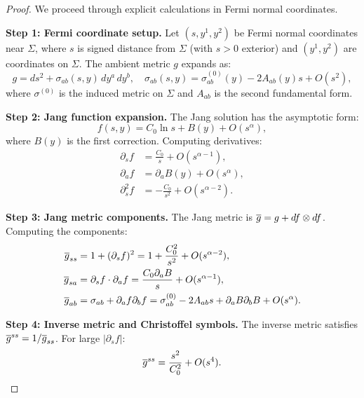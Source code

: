 \begin{proof}
We proceed through explicit calculations in Fermi normal coordinates.

\textbf{Step 1: Fermi coordinate setup.}
Let $(s, y^1, y^2)$ be Fermi normal coordinates near $\Sigma$, where $s$ is signed distance from $\Sigma$ (with $s > 0$ exterior) and $(y^1, y^2)$ are coordinates on $\Sigma$. The ambient metric $g$ expands as:
\begin{equation}\label{eq:FermiExpansion}
    g = ds^2 + \sigma_{ab}(s,y) \, dy^a \, dy^b, \quad \sigma_{ab}(s,y) = \sigma_{ab}^{(0)}(y) - 2 A_{ab}(y) s + O(s^2),
\end{equation}
where $\sigma^{(0)}$ is the induced metric on $\Sigma$ and $A_{ab}$ is the second fundamental form.

\textbf{Step 2: Jang function expansion.}
The Jang solution has the asymptotic form:
\begin{equation}\label{eq:JangExpansion}
    f(s, y) = C_0 \ln s + B(y) + O(s^{\alpha}),
\end{equation}
where $B(y)$ is the first correction. Computing derivatives:
\begin{align}
    \partial_s f &= \frac{C_0}{s} + O(s^{\alpha - 1}), \label{eq:dsf}\\
    \partial_a f &= \partial_a B(y) + O(s^{\alpha}), \label{eq:daf}\\
    \partial_s^2 f &= -\frac{C_0}{s^2} + O(s^{\alpha-2}). \label{eq:dssf}
\end{align}

\textbf{Step 3: Jang metric components.}
The Jang metric is $\overline{g} = g + df \otimes df$. Computing the components:
\begin{align}
    \overline{g}_{ss} &= 1 + (\partial_s f)^2 = 1 + \frac{C_0^2}{s^2} + O(s^{\alpha - 2}), \label{eq:bgss}\\
    \overline{g}_{sa} &= \partial_s f \cdot \partial_a f = \frac{C_0 \partial_a B}{s} + O(s^{\alpha - 1}), \label{eq:bgsa}\\
    \overline{g}_{ab} &= \sigma_{ab} + \partial_a f \partial_b f = \sigma_{ab}^{(0)} - 2A_{ab} s + \partial_a B \partial_b B + O(s^\alpha). \label{eq:bgab}
\end{align}

\textbf{Step 4: Inverse metric and Christoffel symbols.}
The inverse metric satisfies $\overline{g}^{ss} = 1/\overline{g}_{ss}$. For large $|\partial_s f|$:
\begin{equation}\label{eq:bgssInverse}
    \overline{g}^{ss} = \frac{s^2}{C_0^2} + O(s^4).
\end{equation}


\end{proof}
